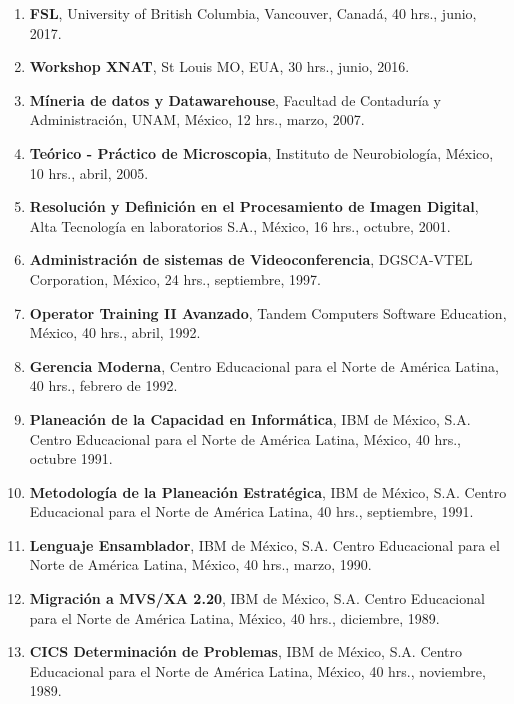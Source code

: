 \begin{enumerate}[itemsep=-1mm]

\item \textbf{FSL}, University of British Columbia, Vancouver, Canadá, 40 hrs., junio, 2017. 

\item \textbf{Workshop XNAT}, St Louis MO, EUA, 30 hrs., junio, 2016. 

\item \textbf{Míneria de datos y Datawarehouse}, Facultad de Contaduría y Administración, UNAM, México, 12 hrs., marzo, 2007.

\item \textbf{Teórico - Práctico de Microscopia}, Instituto de Neurobiología, México, 10 hrs., abril, 2005.

\item \textbf{Resolución y Definición en el Procesamiento de Imagen Digital}, Alta Tecnología en laboratorios S.A., México, 16 hrs., octubre, 2001.

\item \textbf{Administración de sistemas de Videoconferencia}, DGSCA-VTEL Corporation, México, 24 hrs., septiembre, 1997.

\item \textbf{Operator Training II Avanzado}, Tandem Computers Software Education, México, 40 hrs., abril,  1992.

\item \textbf{Gerencia Moderna}, Centro Educacional para el Norte de América Latina, 40 hrs., febrero de 1992.

\item \textbf{Planeación de la Capacidad en Informática}, IBM de México, S.A. Centro Educacional para el Norte de América Latina, México, 40 hrs., 
octubre 1991.

\item \textbf{Metodología de la Planeación Estratégica}, IBM de México, S.A. Centro Educacional para el Norte de América Latina, 40 hrs., septiembre, 1991.
 
\item \textbf{Lenguaje Ensamblador}, IBM de México, S.A. Centro Educacional para el Norte de América Latina, México, 40 hrs., marzo, 1990.
 
\item \textbf{Migración a MVS/XA 2.20}, IBM de México, S.A. Centro Educacional para el Norte de América Latina, México, 40 hrs., diciembre, 1989.

\item \textbf{CICS Determinación de Problemas}, IBM de México, S.A. Centro Educacional para el Norte de América Latina, México, 40 hrs., noviembre, 
1989.


\end{enumerate}
